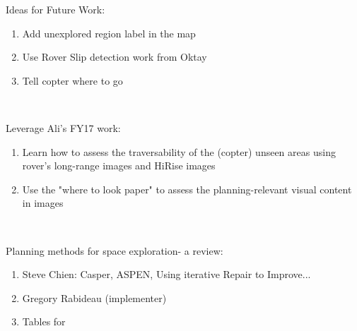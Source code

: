 \documentclass[conference]{IEEEtran}
\begin{document}
Ideas for Future Work:
\begin{enumerate}
  \item Add unexplored region label in the map
  \item Use Rover Slip detection work from Oktay
  \item Tell copter where to go
\end{enumerate} \

Leverage Ali's FY17 work:
\begin{enumerate}
  \item Learn how to assess the traversability of the (copter) unseen areas using rover's long-range images and HiRise images
  \item Use the "where to look paper" to assess the planning-relevant visual content in images
\end{enumerate} \

Planning methods for space exploration- a review:
\begin{enumerate}
  \item Steve Chien: Casper, ASPEN, Using iterative Repair to Improve...
  \item Gregory Rabideau (implementer)
  \item Tables for 
\end{enumerate} 
    
\end{document}

